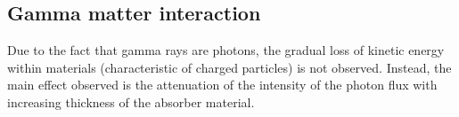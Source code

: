 


\subsection{Gamma matter interaction}
Due to the fact that gamma rays are photons, the gradual loss of kinetic energy within materials (characteristic of charged particles) is not observed. Instead, the main effect observed is the attenuation of the intensity of the photon flux with increasing thickness of the absorber material. 

